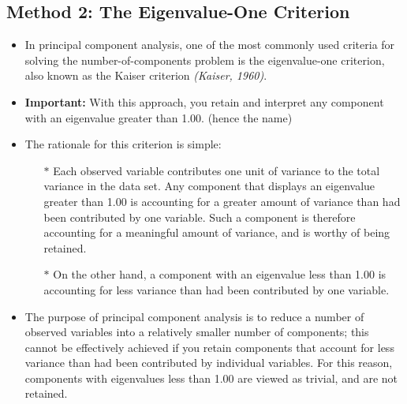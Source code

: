 \documentclass[a4paper,12pt]{article}
\begin{document}
\subsection{Method 2: The Eigenvalue-One Criterion} 
\begin{itemize}
	\item In principal component analysis, one of the most commonly
	used criteria for solving the number-of-components problem is the eigenvalue-one criterion, also
	known as the Kaiser criterion \textit{(Kaiser, 1960)}.  
	\item \textbf{Important:} With this approach, you retain and interpret any
	component with an eigenvalue greater than 1.00. (hence the name)
	\item The rationale for this criterion is simple: 
	\begin{itemize}
	\item[$\ast$] 	  Each observed variable contributes one unit of
	variance to the total variance in the data set.  Any component that displays an eigenvalue greater
	than 1.00 is accounting  for a greater amount of variance than had been contributed by one
	variable.  Such a component is therefore accounting for a meaningful amount of variance, and is
	worthy of being retained.
	
	\item[$\ast$]  	On the other hand, a component with an eigenvalue less than 1.00 is accounting for less variance
	than had been contributed by one variable.  
	\end{itemize}
	\item 
	The purpose of principal component analysis is to
	reduce a number of observed variables into a relatively smaller number of components; this
	cannot be effectively achieved if you retain components that account for less variance than had
	been contributed by individual variables.  For this reason, components with eigenvalues less than
	1.00 are viewed as trivial, and are not retained.
\end{itemize} 
\end{document}
